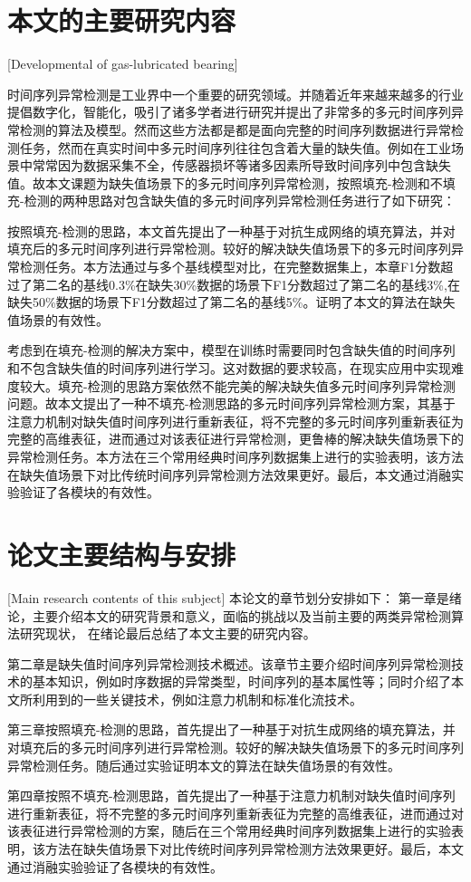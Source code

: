 \section{本文的主要研究内容}[Developmental of gas-lubricated bearing]

时间序列异常检测是工业界中一个重要的研究领域。并随着近年来越来越多的行业提倡数字化，智能化，吸引了诸多学者进行研究并提出了非常多的多元时间序列异常检测的算法及模型。然而这些方法都是都是面向完整的时间序列数据进行异常检测任务，然而在真实时间中多元时间序列往往包含着大量的缺失值。例如在工业场景中常常因为数据采集不全，传感器损坏等诸多因素所导致时间序列中包含缺失值。故本文课题为缺失值场景下的多元时间序列异常检测，按照填充-检测和不填充-检测的两种思路对包含缺失值的多元时间序列异常检测任务进行了如下研究：

按照填充-检测的思路，本文首先提出了一种基于对抗生成网络的填充算法，并对填充后的多元时间序列进行异常检测。较好的解决缺失值场景下的多元时间序列异常检测任务。本方法通过与多个基线模型对比，在完整数据集上，本章F1分数超过了第二名的基线0.3\%在缺失30\%数据的场景下F1分数超过了第二名的基线3\%,在缺失50\%数据的场景下F1分数超过了第二名的基线5\%。证明了本文的算法在缺失值场景的有效性。

考虑到在填充-检测的解决方案中，模型在训练时需要同时包含缺失值的时间序列和不包含缺失值的时间序列进行学习。这对数据的要求较高，在现实应用中实现难度较大。填充-检测的思路方案依然不能完美的解决缺失值多元时间序列异常检测问题。故本文提出了一种不填充-检测思路的多元时间序列异常检测方案，其基于注意力机制对缺失值时间序列进行重新表征，将不完整的多元时间序列重新表征为完整的高维表征，进而通过对该表征进行异常检测，更鲁棒的解决缺失值场景下的异常检测任务。本方法在三个常用经典时间序列数据集上进行的实验表明，该方法在缺失值场景下对比传统时间序列异常检测方法效果更好。最后，本文通过消融实验验证了各模块的有效性。


\section{论文主要结构与安排}[Main research contents of this subject]
本论文的章节划分安排如下： 第一章是绪论，主要介绍本文的研究背景和意义，面临的挑战以及当前主要的两类异常检测算法研究现状， 在绪论最后总结了本文主要的研究内容。

第二章是缺失值时间序列异常检测技术概述。该章节主要介绍时间序列异常检测技术的基本知识，例如时序数据的异常类型，时间序列的基本属性等；同时介绍了本文所利用到的一些关键技术，例如注意力机制和标准化流技术。

第三章按照填充-检测的思路，首先提出了一种基于对抗生成网络的填充算法，并对填充后的多元时间序列进行异常检测。较好的解决缺失值场景下的多元时间序列异常检测任务。随后通过实验证明本文的算法在缺失值场景的有效性。

第四章按照不填充-检测思路，首先提出了一种基于注意力机制对缺失值时间序列进行重新表征，将不完整的多元时间序列重新表征为完整的高维表征，进而通过对该表征进行异常检测的方案，随后在三个常用经典时间序列数据集上进行的实验表明，该方法在缺失值场景下对比传统时间序列异常检测方法效果更好。最后，本文通过消融实验验证了各模块的有效性。